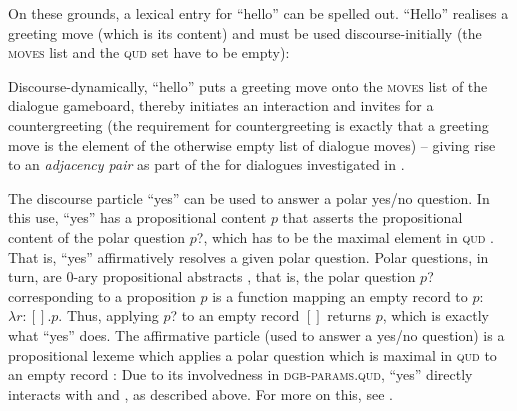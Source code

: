 \documentclass[output=paper
 	        ,biblatex
                ,babelshorthands
                ,newtxmath
                ,draftmode
                ,colorlinks, citecolor=brown
]{langscibook}
\begin{document}
On these grounds, a lexical entry for \enquote{hello} can be spelled out.
%
\enquote{Hello} realises a greeting move (which is its content) and must be used discourse-initially (the \textsc{moves} list and the \textsc{qud} set have to be empty):
%
\ea
\avm{
[phon & : < hello > \\
cat & :	[head=\type{interjection} & : syncat ] \\
dgb-params & :	[spkr & : Ind \\ 
               addr & : Ind \\
               moves=< > & : list!(IllocProp)! \\ 
               qud=\{ \} & : poset!(Question)! ] \\
\punk{cont=Greet(spkr,addr)}{: \textsc{IllocProp}} ]
}
\z 

Discourse-dynamically, \enquote{hello} puts a greeting move onto the \textsc{moves} list of the dialogue gameboard, thereby initiates an interaction and invites for a countergreeting (the requirement for countergreeting is exactly that a greeting move is the element of the otherwise empty list of dialogue moves) -- giving rise to an \emph{adjacency pair}  as part of the  for dialogues investigated in  \citep{Schegloff:Sacks:1973}.

The discourse particle \enquote{yes} can be used to answer a polar yes/no question. 
%
In this use, \enquote{yes} has a propositional content $p$ that asserts the propositional content of the polar question $p$?, which has to be the maximal element in \textsc{qud} \citep[Chapter 2,  \textit{et seq.}]{Ginzburg:2012}.
%
That is, \enquote{yes} affirmatively resolves a given polar question.
%
Polar questions, in turn, are 0-ary propositional abstracts \citep[]{Ginzburg:2012}, that is, the polar question $p$? corresponding to a proposition $p$ is a function mapping an empty record to $p$: $\lambda r : [] . p$.
%
Thus, applying $p$? to an empty record $[]$ returns $p$, which is exactly what \enquote{yes} does.
%
The affirmative particle (used to answer a yes/no question) is a propositional lexeme which applies a polar question which is maximal in \textsc{qud} to an empty record \citep[cf.][]{Ginzburg:2012}:
%
\ea
{}
\z 
%
Due to its involvedness in \textsc{dgb-params.qud}, \enquote{yes} directly interacts with  and , as described above.
%
For more on this, see \citet{Ginzburg:2012}.
\end{document}
